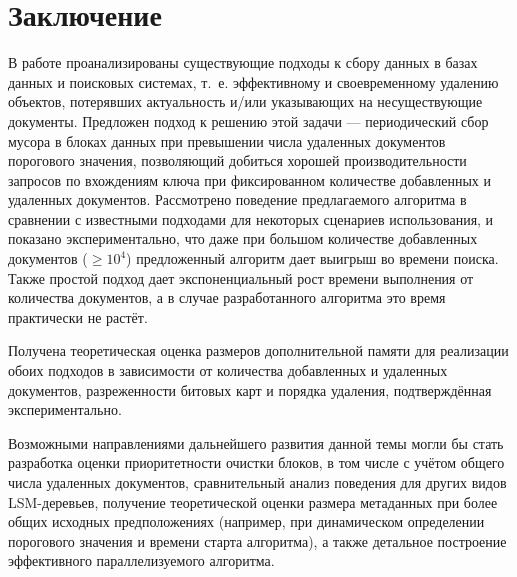 \newpage
\section{Заключение}

В работе проанализированы существующие подходы к сбору данных в базах данных
и поисковых системах, т.~е. эффективному и своевременному удалению объектов,
потерявших актуальность и/или указывающих на несуществующие документы.
Предложен подход к решению этой задачи --- периодический сбор мусора в блоках
данных при превышении числа удаленных документов порогового значения,
позволяющий добиться хорошей производительности запросов по вхождениям
ключа при фиксированном количестве добавленных и удаленных документов. Рассмотрено поведение
предлагаемого алгоритма в сравнении с известными подходами для некоторых
сценариев использования, и показано экспериментально, что
даже при большом количестве добавленных документов ($\ge 10^{4}$)
предложенный алгоритм дает выигрыш во времени поиска. Также
простой подход дает экспоненциальный рост времени выполнения от количества
документов, а в случае разработанного алгоритма это время практически
не растёт.

Получена теоретическая оценка размеров дополнительной памяти для реализации
обоих подходов в зависимости от количества добавленных и удаленных документов,
разреженности битовых карт и порядка удаления, подтверждённая экспериментально.

Возможными направлениями дальнейшего развития данной темы могли бы
стать разработка оценки приоритетности очистки блоков, в том числе с учётом
общего числа удаленных документов, сравнительный анализ поведения для других
видов LSM-деревьев, получение теоретической оценки размера метаданных при более общих
исходных предположениях (например, при динамическом определении порогового значения
и времени старта алгоритма), а также детальное построение эффективного
параллелизуемого алгоритма.